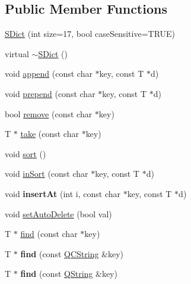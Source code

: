 \subsection*{Public Member Functions}
\begin{DoxyCompactItemize}
\item 
\mbox{\hyperlink{class_s_dict_a302a5a7c25fce8e9e93f7dede81ad503}{S\+Dict}} (int size=17, bool case\+Sensitive=T\+R\+UE)
\item 
virtual \mbox{\hyperlink{class_s_dict_a49594f6c587e0915be3861538a3c96cb}{$\sim$\+S\+Dict}} ()
\item 
void \mbox{\hyperlink{class_s_dict_a121842d9858421076b81ed663034d62c}{append}} (const char $\ast$key, const T $\ast$d)
\item 
void \mbox{\hyperlink{class_s_dict_adcfbdc244e81360522457c8a84069f2b}{prepend}} (const char $\ast$key, const T $\ast$d)
\item 
bool \mbox{\hyperlink{class_s_dict_ad647b04c9dff33ac0182c4d83b025c77}{remove}} (const char $\ast$key)
\item 
T $\ast$ \mbox{\hyperlink{class_s_dict_ac5aa2cf317cef817cf585efdab3663d7}{take}} (const char $\ast$key)
\item 
void \mbox{\hyperlink{class_s_dict_ab6da88a61ee284dfbd07830fcd63aed3}{sort}} ()
\item 
void \mbox{\hyperlink{class_s_dict_a25a85aeba441b4c855ea7be25a4741b5}{in\+Sort}} (const char $\ast$key, const T $\ast$d)
\item 
\mbox{\label{class_s_dict_a7f0a7e316d26fccdf7d0d351837a6614}} 
void {\bfseries insert\+At} (int i, const char $\ast$key, const T $\ast$d)
\item 
void \mbox{\hyperlink{class_s_dict_ac5ed340a2e6b4b4fb8398254cd35ef55}{set\+Auto\+Delete}} (bool val)
\item 
T $\ast$ \mbox{\hyperlink{class_s_dict_aec67482d780157680d46f48a7ed5e7bd}{find}} (const char $\ast$key)
\item 
\mbox{\label{class_s_dict_a357a25974d906de30d2e34de08b35a4e}} 
T $\ast$ {\bfseries find} (const \mbox{\hyperlink{class_q_c_string}{Q\+C\+String}} \&key)
\item 
\mbox{\label{class_s_dict_abc60b1cc06b0643753906387b7cccfe2}} 
T $\ast$ {\bfseries find} (const \mbox{\hyperlink{class_q_string}{Q\+String}} \&key)
\item 

\end{DoxyCompactItemize}
